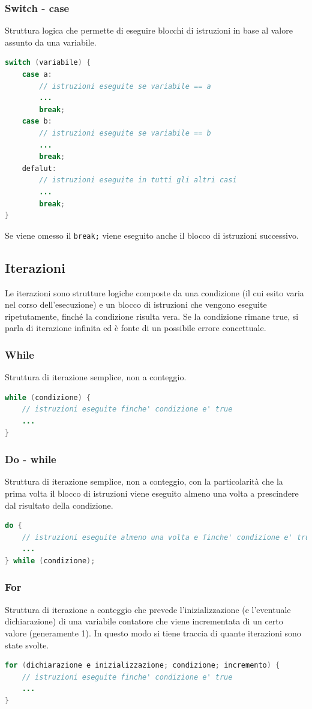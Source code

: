 \documentclass{article}
\begin{document}
\subsubsection*{Switch - case}
Struttura logica che permette di eseguire blocchi di istruzioni in base al valore assunto da una variabile.
\begin{lstlisting}[language=Java]
switch (variabile) {
	case a:
		// istruzioni eseguite se variabile == a
		...
		break;
	case b:
		// istruzioni eseguite se variabile == b
		...
		break;
	defalut:
		// istruzioni eseguite in tutti gli altri casi
		...
		break;
}
\end{lstlisting}
Se viene omesso il \verb|break;| viene eseguito anche il blocco di istruzioni successivo.

\subsection{Iterazioni}
Le iterazioni sono strutture logiche composte da una condizione (il cui esito varia nel corso dell'esecuzione) e un blocco di
istruzioni che vengono eseguite ripetutamente, finché la condizione risulta vera. Se la condizione rimane true, si parla di
iterazione infinita ed è fonte di un possibile errore concettuale.

\subsubsection*{While}
Struttura di iterazione semplice, non a conteggio.
\begin{lstlisting}[language=Java]
while (condizione) {
	// istruzioni eseguite finche' condizione e' true
	...
}
\end{lstlisting}

\subsubsection*{Do - while}
Struttura di iterazione semplice, non a conteggio, con la particolarità che la prima volta il blocco di istruzioni viene eseguito
almeno una volta a prescindere dal risultato della condizione.
\begin{lstlisting}[language=Java]
do {
	// istruzioni eseguite almeno una volta e finche' condizione e' true
	...
} while (condizione);
\end{lstlisting}

\subsubsection*{For}
Struttura di iterazione a conteggio che prevede l'inizializzazione (e l'eventuale dichiarazione) di una variabile contatore che
viene incrementata di un certo valore (generamente 1). In questo modo si tiene traccia di quante iterazioni sono state svolte.
\begin{lstlisting}[language=Java]
for (dichiarazione e inizializzazione; condizione; incremento) {
	// istruzioni eseguite finche' condizione e' true
	...
}
\end{lstlisting}
\end{document}
